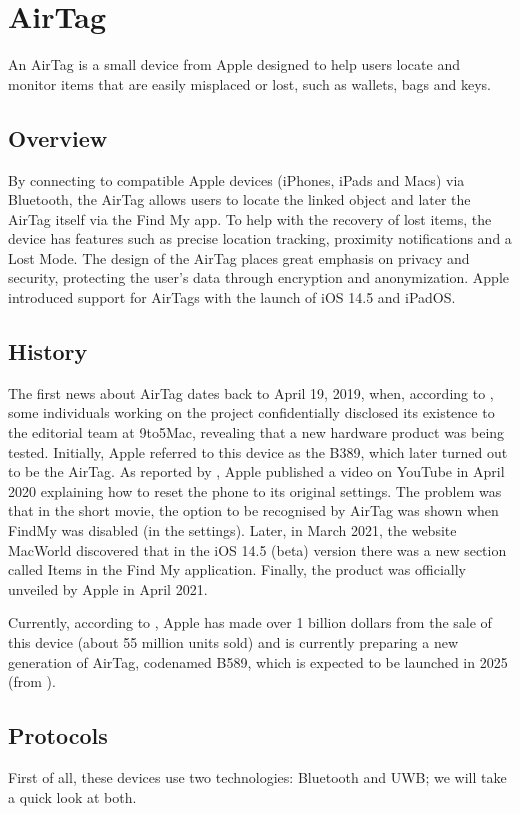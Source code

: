 \documentclass[english]{article}
\begin{document}
\section{AirTag}\label{sec:at}
An AirTag is a small device from Apple designed to help users locate and monitor items that are easily misplaced or lost, such as wallets, bags and keys.
\subsection{Overview}
By connecting to compatible Apple devices (iPhones, iPads and Macs) via Bluetooth, the AirTag allows users to locate the linked object and later the AirTag itself via the Find My app. To help with the recovery of lost items, the device has features such as precise location tracking, proximity notifications and a Lost Mode. The design of the AirTag places great emphasis on privacy and security, protecting the user's data through encryption and anonymization. Apple introduced support for AirTags with the launch of iOS 14.5 and iPadOS.
\subsection{History}
The first news about AirTag dates back to April 19, 2019, when, according to \cite{Rambo_2019}, some individuals working on the project confidentially disclosed its existence to the editorial team at 9to5Mac, revealing that a new hardware product was being tested. Initially, Apple referred to this device as the B389, which later turned out to be the AirTag. As reported by \cite{TechCrunch}, Apple published a video on YouTube in April 2020 explaining how to reset the phone to its original settings. The problem was that in the short movie, the option to be recognised by AirTag was shown when FindMy was disabled (in the settings). Later, in March 2021, the website MacWorld \cite{Macworld} discovered that in the iOS 14.5 (beta) version there was a new section called Items in the Find My application. Finally, the product was officially unveiled by Apple in April 2021. 

Currently, according to \cite{Kumar_2023}, Apple has made over 1 billion dollars from the sale of this device (about 55 million units sold) and is currently preparing a new generation of AirTag, codenamed B589, which is expected to be launched in 2025 (from \cite{Bloomberg}).

\subsection{Protocols}
First of all, these devices use two technologies: Bluetooth and UWB; we will take a quick look at both.
\end{document}
